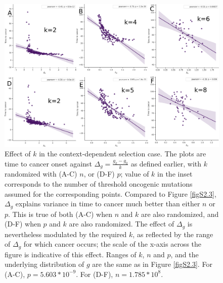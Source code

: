 \documentclass[10pt,twocolumn,twoside]{article}
\begin{document}
		\begin{figure}[tbhp]
			\centering
			\includegraphics[width=\linewidth, keepaspectratio=true]{figS2-4.png}
			\caption{Effect of $k$ in the context-dependent selection case. The plots are time to cancer onset against $\Delta_{g} = \frac{g_{k}-g_{0}}{k}$ as defined earlier, with $k$ randomized with (A-C) $n$, or (D-F) $p$; value of $k$ in the inset corresponds to the number of threshold oncogenic mutations assumed for the corresponding points. Compared to Figure \ref{figS2.3}, $\Delta_{g}$ explains variance in time to cancer much better than either $n$ or $p$. This is true of both (A-C) when $n$ and $k$ are also randomized, and (D-F) when $p$ and $k$ are also randomized. The effect of $\Delta_{g}$ is nevertheless modulated by the required $k$, as reflected by the range of $\Delta_{g}$ for which cancer occurs; the scale of the x-axis across the figure is indicative of this effect. Ranges of $k$, $n$ and $p$, and the underlying distribution of $g$ are the same as in Figure \ref{figS2.3}. For (A-C), $p=5.603*10^{-9}$. For (D-F), $n=1.785*10^{8}$.}
			\label{figS2.4}
		\end{figure}
\end{document}
